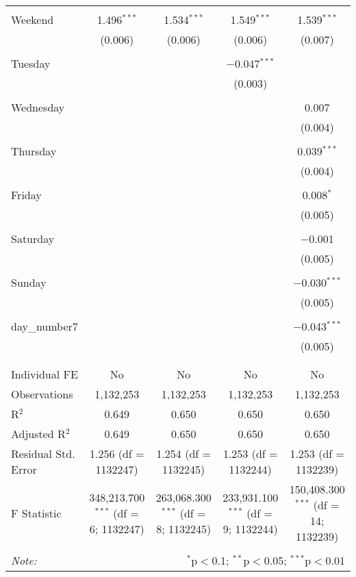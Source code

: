\documentclass[
]{article}
\begin{document}
\begin{table}[!htbp]
{\begin{tabular}{@{\extracolsep{5pt}}lcccc}
  & & & & \\ 
 Weekend & 1.496$^{***}$ & 1.534$^{***}$ & 1.549$^{***}$ & 1.539$^{***}$ \\ 
  & (0.006) & (0.006) & (0.006) & (0.007) \\ 
  & & & & \\ 
 Tuesday &  &  & $-$0.047$^{***}$ &  \\ 
  &  &  & (0.003) &  \\ 
  & & & & \\ 
 Wednesday &  &  &  & 0.007 \\ 
  &  &  &  & (0.004) \\ 
  & & & & \\ 
 Thursday &  &  &  & 0.039$^{***}$ \\ 
  &  &  &  & (0.004) \\ 
  & & & & \\ 
 Friday &  &  &  & 0.008$^{*}$ \\ 
  &  &  &  & (0.005) \\ 
  & & & & \\ 
 Saturday &  &  &  & $-$0.001 \\ 
  &  &  &  & (0.005) \\ 
  & & & & \\ 
 Sunday &  &  &  & $-$0.030$^{***}$ \\ 
  &  &  &  & (0.005) \\ 
  & & & & \\ 
 day\_number7 &  &  &  & $-$0.043$^{***}$ \\ 
  &  &  &  & (0.005) \\ 
  & & & & \\ 
\hline \\[-1.8ex] 
Individual FE & No & No & No & No \\ 
Observations & 1,132,253 & 1,132,253 & 1,132,253 & 1,132,253 \\ 
R$^{2}$ & 0.649 & 0.650 & 0.650 & 0.650 \\ 
Adjusted R$^{2}$ & 0.649 & 0.650 & 0.650 & 0.650 \\ 
Residual Std. Error & 1.256 (df = 1132247) & 1.254 (df = 1132245) & 1.253 (df = 1132244) & 1.253 (df = 1132239) \\ 
F Statistic & 348,213.700$^{***}$ (df = 6; 1132247) & 263,068.300$^{***}$ (df = 8; 1132245) & 233,931.100$^{***}$ (df = 9; 1132244) & 150,408.300$^{***}$ (df = 14; 1132239) \\ 
\hline 
\hline \\[-1.8ex] 
\textit{Note:}  & \multicolumn{4}{r}{$^{*}$p$<$0.1; $^{**}$p$<$0.05; $^{***}$p$<$0.01} \\ 
\end{tabular}
} 
\end{table} 
\newpage
\end{document}
